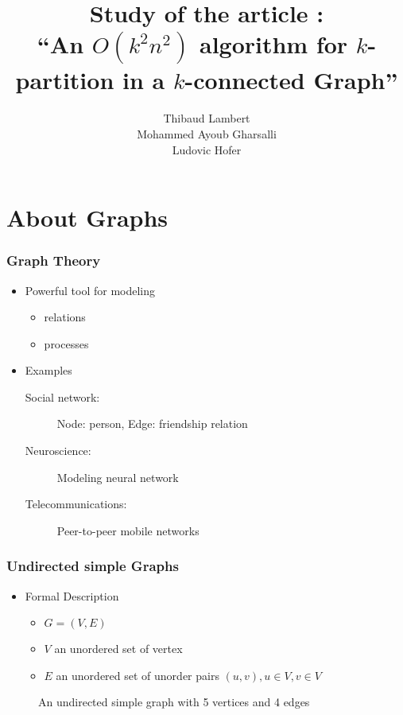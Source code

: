 \documentclass[xcolor=dvipsnames]{beamer}
\title[$O(k^2n^2)$ algorithm for $k$-partitionning]{Study of the article :\\``An $O(k^2n^2)$ algorithm for $k$-partition in a $k$-connected Graph''}
\author[Lambert, Gharsalli, Hofer]
       {Thibaud Lambert\\Mohammed Ayoub Gharsalli\\Ludovic Hofer}
\institute{University of Bordeaux I}
\begin{document}
\begin{frame}[plain]
  \maketitle
\end{frame}

\begin{frame}[plain]
  \tableofcontents
\end{frame}

\section{About Graphs}

\begin{frame}
  \frametitle{Graph Theory}
  \begin{itemize}
  \item Powerful tool for modeling
    \begin{itemize}
    \item relations
    \item processes
    \end{itemize}
  \item Examples
    \begin{description}
     \item [Social network:] Node: person, Edge: friendship relation
     \item [Neuroscience:] Modeling neural network  \cite{BuSp09}
     \item [Telecommunications:] Peer-to-peer mobile networks  \cite{FaCh99}
    \end{description}
  \end{itemize}
\end{frame}

\begin{frame}
  \frametitle{Undirected simple Graphs}
  \begin{itemize}
    \item Formal Description
      \begin{itemize}
      \item $G = (V,E)$
      \item $V$ an unordered set of vertex
      \item $E$ an unordered set of unorder pairs $(u,v), u \in V, v \in V$
      \end{itemize}
  \end{itemize}
  \begin{figure}
    \begin{center}
    
    \end{center}
    \caption{An undirected simple graph with 5 vertices and 4 edges}
  \end{figure}
\end{frame}
\end{document}
